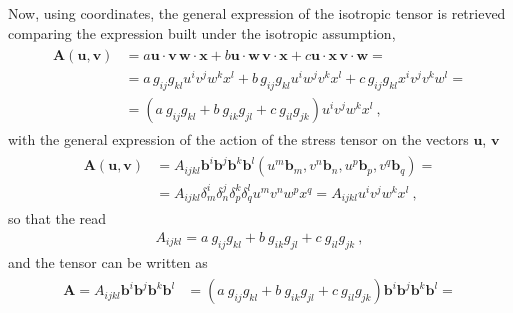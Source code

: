 \documentclass[letterpaper,10pt,english]{jupyterBook}
\begin{document}
\sphinxAtStartPar
Now, using coordinates, the general expression of the isotropic tensor is retrieved comparing the expression built under the isotropic assumption,
\begin{equation*}
\begin{split}\begin{aligned}
  \mathbf{A}(\mathbf{u}, \mathbf{v}) 
  & = a \mathbf{u} \cdot \mathbf{v} \, \mathbf{w} \cdot \mathbf{x}
    + b \mathbf{u} \cdot \mathbf{w} \, \mathbf{v} \cdot \mathbf{x}
    + c \mathbf{u} \cdot \mathbf{x} \, \mathbf{v} \cdot \mathbf{w} = \\
  & = a \, g_{ij} g_{kl} u^i v^j w^k x^l
    + b \, g_{ij} g_{kl} u^i w^j v^k x^l
    + c \, g_{ij} g_{kl} x^i v^j v^k w^l = \\
  & = \left( a \ g_{ij} g_{kl} + b \ g_{ik} g_{jl} + c \ g_{il} g_{jk} \right) u^i v^j w^k x^l \ ,
\end{aligned}\end{split}
\end{equation*}
\sphinxAtStartPar
with the general expression of the action of the stress tensor on the vectors \(\mathbf{u}\), \(\mathbf{v}\)
\begin{equation*}
\begin{split}\begin{aligned}
\mathbf{A}(\mathbf{u}, \mathbf{v})
& = A_{ijkl} \mathbf{b}^i \mathbf{b}^j \mathbf{b}^k \mathbf{b}^l \left( u^m \mathbf{b}_m, v^n \mathbf{b}_n,  u^p \mathbf{b}_p, v^q \mathbf{b}_q \right) = \\
& = A_{ijkl} \delta^i_m \delta^j_n \delta^k_p \delta^l_q u^m v^n w^p x^q = A_{ijkl} u^i v^j w^k x^l \ ,
\end{aligned}\end{split}
\end{equation*}
\sphinxAtStartPar
so that the  read
\begin{equation*}
\begin{split}A_{ijkl} = a \ g_{ij} g_{kl} + b \ g_{ik} g_{jl} + c \ g_{il} g_{jk} \ ,\end{split}
\end{equation*}
\sphinxAtStartPar
and the tensor can be written as
\begin{equation*}
\begin{split}\begin{aligned}
  \mathbf{A} 
  = A_{ijkl} \mathbf{b}^i \mathbf{b}^j \mathbf{b}^k \mathbf{b}^l
  & = \left(  a \ g_{ij} g_{kl} + b \ g_{ik} g_{jl} + c \ g_{il} g_{jk} \right) \mathbf{b}^i \mathbf{b}^j \mathbf{b}^k \mathbf{b}^l = \\
\end{aligned}\end{split}
\end{equation*}
\end{document}
